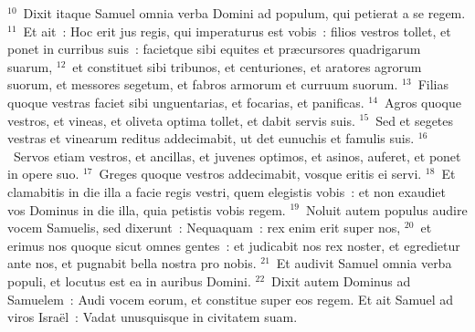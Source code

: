 ${}^{10}$~Dixit itaque Samuel omnia verba Domini ad populum, qui petierat a se regem.
${}^{11}$~Et ait~: Hoc erit jus regis, qui imperaturus est vobis~: filios vestros tollet, et ponet in curribus suis~: facietque sibi equites et pr\ae cursores quadrigarum suarum,
${}^{12}$~et constituet sibi tribunos, et centuriones, et aratores agrorum suorum, et messores segetum, et fabros armorum et curruum suorum.
${}^{13}$~Filias quoque vestras faciet sibi unguentarias, et focarias, et panificas.
${}^{14}$~Agros quoque vestros, et vineas, et oliveta optima tollet, et dabit servis suis.
${}^{15}$~Sed et segetes vestras et vinearum reditus addecimabit, ut det eunuchis et famulis suis.
${}^{16}$~Servos etiam vestros, et ancillas, et juvenes optimos, et asinos, auferet, et ponet in opere suo.
${}^{17}$~Greges quoque vestros addecimabit, vosque eritis ei servi.
${}^{18}$~Et clamabitis in die illa a facie regis vestri, quem elegistis vobis~: et non exaudiet vos Dominus in die illa, quia petistis vobis regem.
${}^{19}$~Noluit autem populus audire vocem Samuelis, sed dixerunt~: Nequaquam~: rex enim erit super nos,
${}^{20}$~et erimus nos quoque sicut omnes gentes~: et judicabit nos rex noster, et egredietur ante nos, et pugnabit bella nostra pro nobis.
${}^{21}$~Et audivit Samuel omnia verba populi, et locutus est ea in auribus Domini.
${}^{22}$~Dixit autem Dominus ad Samuelem~: Audi vocem eorum, et constitue super eos regem. Et ait Samuel ad viros Isra\"el~: Vadat unusquisque in civitatem suam.

